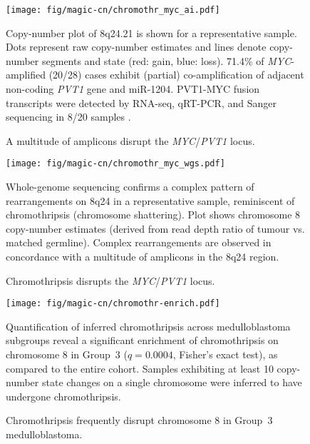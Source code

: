 \documentclass[11pt,letterpaper]{article}
\theoremstyle{definition}
\begin{document}
\clearpage

\begin{figure}[h]
	\begin{center}
		\texttt{[image: fig/magic-cn/chromothr\_myc\_ai.pdf]}
	\end{center}
	\caption{A multitude of amplicons disrupt the \emph{MYC}/\emph{PVT1} locus.}
	Copy-number plot of 8q24.21 is shown for a representative sample. Dots represent raw copy-number estimates and lines denote copy-number segments and state (red: gain, blue: loss). 71.4\% of \emph{MYC}-amplified (20/28) cases exhibit (partial) co-amplification of adjacent non-coding \emph{PVT1} gene and miR-1204. PVT1-MYC fusion transcripts were detected by RNA-seq, qRT-PCR, and Sanger sequencing in 8/20 samples .
	\label{fig:chromothr_myc}
\end{figure}

\begin{figure}[h]
	\begin{center}
		\texttt{[image: fig/magic-cn/chromothr\_myc\_wgs.pdf]}
	\end{center}
	\caption{Chromothripsis disrupts the \emph{MYC}/\emph{PVT1} locus.}
	Whole-genome sequencing confirms a complex pattern of rearrangements on 8q24 in a representative sample, reminiscent of chromothripsis (chromosome shattering).
	Plot shows chromosome 8 copy-number estimates (derived from read depth ratio of tumour vs. matched germline).
	Complex rearrangements are observed in concordance with a multitude of amplicons in the 8q24 region.
	\label{fig:chromothr_myc_wgs}
\end{figure}

\begin{figure}[h]
	\begin{center}
		\texttt{[image: fig/magic-cn/chromothr-enrich.pdf]}
	\end{center}
	\caption{Chromothripsis frequently disrupt chromosome 8 in Group~3 medulloblastoma.}
	Quantification of inferred chromothripsis across medulloblastoma subgroups reveal a significant enrichment of chromothripsis on chromosome 8 in Group~3 ($q = 0.0004$, Fisher's exact test), as compared to the entire cohort. Samples exhibiting at least 10 copy-number state changes on a single chromosome were inferred to have undergone chromothripsis.
	\label{fig:chromothr-enrich}
\end{figure}
\end{document}
